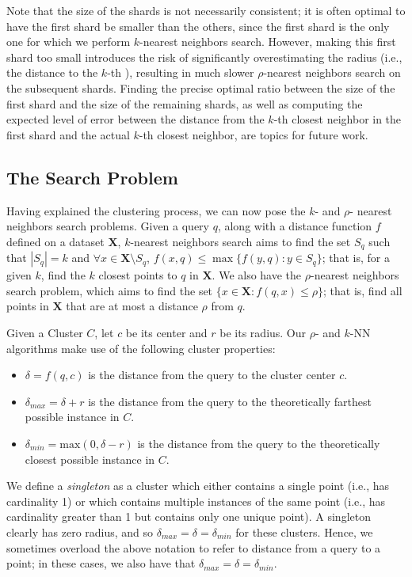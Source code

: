Note that the size of the shards is not necessarily consistent; it is often optimal to have the first shard be smaller than the others,
since the first shard is the only one for which we perform $k$-nearest neighbors search. However, making this first shard too small
introduces the risk of significantly overestimating the radius (i.e., the distance to the $k$-th ), resulting in much slower $\rho$-nearest neighbors search on the subsequent shards.
Finding the precise optimal ratio between the size of the first shard and the size of the remaining shards, as well 
as computing the expected level of error between the distance from the $k$-th closest neighbor in the first shard and the 
actual $k$-th closest neighbor, are topics for future work.

\subsection{The Search Problem}
\label{subsec:methods:general-search}
Having explained the clustering process, we can now pose the $k$- and $\rho$- nearest neighbors search problems.
Given a query $q$, along with a distance function $f$ defined on a dataset $\textbf{X}$, $k$-nearest neighbors search aims to find 
the set $S_q$ such that  $|S_q| = k$ and $\forall x \in \textbf{X} \setminus S_q$, $f(x, q) \leq \max\{f(y, q): y \in S_q \}$; that is,
for a given $k$, find the $k$ closest points to $q$ in $ \textbf{X}$.
We also have the $\rho$-nearest neighbors search problem, which aims to find the set $\{x \in \textbf{X}: f(q, x) \leq \rho \}$; that is, 
find all points in $\textbf{X}$ that are at most a distance $\rho$ from $q$.

Given a Cluster $C$, let $c$ be its center and $r$ be its radius. Our $\rho$- and $k$-NN algorithms make use of the following cluster 
properties:
\begin{itemize}
    \item $\delta = f(q, c)$ is the distance from the query to the cluster center $c$.
    \item $\delta_{max} = \delta + r$ is the distance from the query to the theoretically farthest possible instance in $C$.
    \item $\delta_{min} = \text{max}(0, \delta - r)$ is the distance from the query to the theoretically closest possible instance in $C$.
\end{itemize}


We define a \emph{singleton} as a cluster which either contains a single point (i.e., has cardinality 1) or which contains 
multiple instances of the same point (i.e., has cardinality greater than 1 but contains only one unique point). A singleton clearly 
has zero radius, and so $\delta_{max}  = \delta = \delta_{min}$ for these clusters. Hence, we sometimes overload the above 
notation to refer to distance from a query to a point; in these cases, we also have that $\delta_{max} = \delta = \delta_{min}$.

